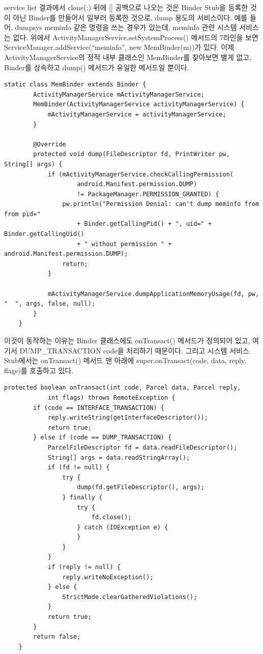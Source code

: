service list 결과에서 clone(:) 뒤에 [] 공백으로 나오는 것은 Binder Stub을 등록한 것이 아닌 Binder를 만들어서 일부러 등록한 것으로, dump 용도의 서비스이다.
예를 들어, dumpsys meminfo 같은 명령을 쓰는 경우가 있는데, meminfo 관련 시스템 서비스는 없다. 
위에서 ActivityManagerService.setSystemProcess() 메서드의 7라인을 보면 ServiceManager.addService(``meminfo'', new MemBinder(m))가 있다.
이제 ActivityManagerService의 정적 내부 클래스인 MemBinder를 찾아보면 별게 없고, Binder를 상속하고 dump() 메서드가 유일한 메서드일 뿐이다.
\begin{lstlisting}[frame=single]
    static class MemBinder extends Binder {
        ActivityManagerService mActivityManagerService;
        MemBinder(ActivityManagerService activityManagerService) {
            mActivityManagerService = activityManagerService;
        }

        @Override
        protected void dump(FileDescriptor fd, PrintWriter pw, String[] args) {
            if (mActivityManagerService.checkCallingPermission(
            		android.Manifest.permission.DUMP)
                    != PackageManager.PERMISSION_GRANTED) {
                pw.println("Permission Denial: can't dump meminfo from from pid="
                	+ Binder.getCallingPid() + ", uid=" + Binder.getCallingUid()
                    + " without permission " + android.Manifest.permission.DUMP);
                return;
            }

            mActivityManagerService.dumpApplicationMemoryUsage(fd, pw, "  ", args, false, null);
        }
    }
\end{lstlisting}
이것이 동작하는 이유는 Binder 클래스에도 onTransact() 메서드가 정의되어 있고,
여기서 DUMP\_TRANSAC\-TION code을 처리하기 때문이다.
그리고 시스템 서비스 Stub에서는 onTransact() 메서드 맨 아래에 super.onTransact(code, data, reply, flags)를 호출하고 있다.

\begin{lstlisting}[frame=single]
   protected boolean onTransact(int code, Parcel data, Parcel reply,
            int flags) throws RemoteException {
        if (code == INTERFACE_TRANSACTION) {
            reply.writeString(getInterfaceDescriptor());
            return true;
        } else if (code == DUMP_TRANSACTION) {
            ParcelFileDescriptor fd = data.readFileDescriptor();
            String[] args = data.readStringArray();
            if (fd != null) {
                try {
                    dump(fd.getFileDescriptor(), args);
                } finally {
                    try {
                        fd.close();
                    } catch (IOException e) {
                    }
                }
            }
            if (reply != null) {
                reply.writeNoException();
            } else {
                StrictMode.clearGatheredViolations();
            }
            return true;
        }
        return false;
    }
\end{lstlisting}

